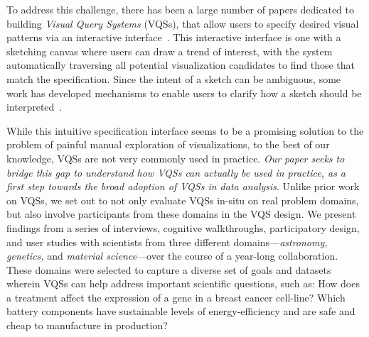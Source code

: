 \par To address this challenge, 
there has been a large number of papers 
dedicated to building {\em Visual Query Systems} (VQSs), 
that allow users to specify 
desired visual patterns 
via an interactive interface~\cite{mohebbi2011google,Hochheiser2004,wattenberg2001sketching,Siddiqui2017VLDB,ryall2005querylines,correll2016semantics,Mannino2018,Eichmann2015,Holz2009}. 
This interactive interface is one with 
a sketching canvas
where users can draw a trend of interest,
with the system automatically traversing 
all potential visualization candidates 
to find those that match the specification. 
Since the intent of a sketch can be ambiguous, 
some work has developed mechanisms to
enable users to clarify 
how a sketch should be interpreted~\cite{ryall2005querylines,correll2016semantics,Mannino2018,Eichmann2015,Holz2009}. 

\par 
While this intuitive 
specification interface 
seems to be a promising solution 
to the problem of painful manual exploration of visualizations, 
to the best of our knowledge, VQSs are not very commonly used in practice. 
{\em Our paper seeks to bridge this gap 
to understand how VQSs can actually be used in practice, 
as a first step towards the broad adoption of VQSs in data analysis}.
Unlike prior work on VQSs,
we set out to not only evaluate VQSs in-situ on
real problem domains, but also involve participants
from these domains in the VQS design. 
We present findings from a series of interviews, 
cognitive walkthroughs, participatory design, 
and user studies with scientists from three different domains---{\em astronomy, genetics,} and {\em material science}---over the course of 
a year-long collaboration. 
These domains were selected to capture 
a diverse set of goals 
and datasets wherein VQSs can help address 
important scientific questions, such as: 
How does a treatment affect the expression 
of a gene in a breast cancer cell-line? 
Which battery components have sustainable 
levels of energy-efficiency and are safe and 
cheap to manufacture in production?

